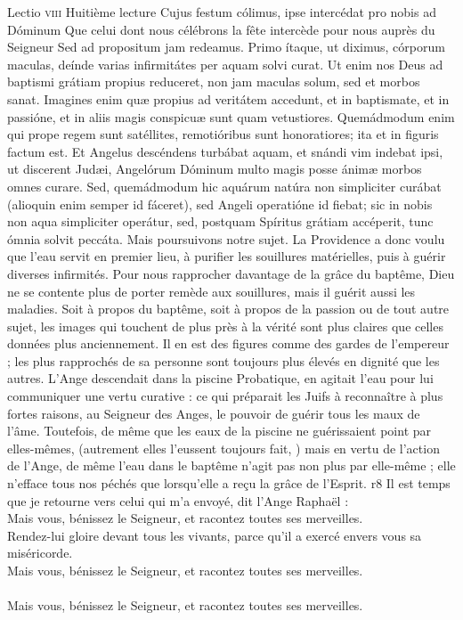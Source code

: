 \documentclass[twoside]{article}
\begin{document}
\begin{paracol}[1]{2}
\lectioresponsorium
	{Lectio \textsc{viii}}
	{Huitième lecture}
	{Cujus festum cólimus, ipse intercédat pro nobis ad Dóminum}
	{Que celui dont nous célébrons la fête intercède pour nous auprès du Seigneur}
	{
		Sed ad propositum jam redeamus. Primo ítaque, ut diximus, córporum maculas, deínde varias infirmitátes per aquam solvi curat. Ut enim nos Deus ad baptismi grátiam propius reduceret, non jam maculas solum, sed et morbos sanat. Imagines enim quæ propius ad veritátem accedunt, et in baptismate, et in passióne, et in aliis magis conspicuæ sunt quam vetustiores. Quemádmodum enim qui prope regem sunt satéllites, remotióribus sunt honoratiores; ita et in figuris factum est. Et Angelus descéndens turbábat aquam, et snándi vim indebat ipsi, ut discerent Judæi, Angelórum Dóminum multo magis posse ánimæ morbos omnes curare. Sed, quemádmodum hic aquárum natúra non simpliciter curábat (alioquin enim semper id fáceret), sed Angeli operatióne id fiebat; sic in nobis non aqua simpliciter operátur, sed, postquam Spíritus grátiam accéperit, tunc ómnia solvit peccáta.
	}
	{
		Mais poursuivons notre sujet. La Providence a donc voulu que l’eau servit en premier lieu, à purifier les souillures matérielles, puis à guérir diverses infirmités. Pour nous rapprocher davantage de la grâce du baptême, Dieu ne se contente plus de porter remède aux souillures, mais il guérit aussi les maladies. Soit à propos du baptême, soit à propos de la passion ou de tout autre sujet, les images qui touchent de plus près à la vérité sont plus claires que celles données plus anciennement. Il en est des figures comme des gardes de l’empereur ; les plus rapprochés de sa personne sont toujours plus élevés en dignité que les autres. L’Ange descendait dans la piscine Probatique, en agitait l’eau pour lui communiquer une vertu curative : ce qui préparait les Juifs à reconnaître à plus fortes raisons, au Seigneur des Anges, le pouvoir de guérir tous les maux de l’âme. Toutefois, de même que les eaux de la piscine ne guérissaient point par elles-mêmes, (autrement elles l’eussent toujours fait, ) mais en vertu de l’action de l’Ange, de même l’eau dans le baptême n’agit pas non plus par elle-même ; elle n’efface tous nos péchés que lorsqu’elle a reçu la grâce de l’Esprit.
	}
	{r8}
	{\vfill
	\rr Il est temps que je retourne vers celui qui m’a envoyé, dit l’Ange Raphaël :\\
	\GreSpecial{*} Mais vous, bénissez le Seigneur, et racontez toutes ses merveilles.\\
	\vv Rendez-lui gloire devant tous les vivants, parce qu’il a exercé envers vous sa miséricorde.\\
	\GreSpecial{*} Mais vous, bénissez le Seigneur, et racontez toutes ses merveilles.\\
	\versetGloireAuPere{}\\
	\GreSpecial{*} Mais vous, bénissez le Seigneur, et racontez toutes ses merveilles.\vfill}
	

\end{paracol}
\end{document}

